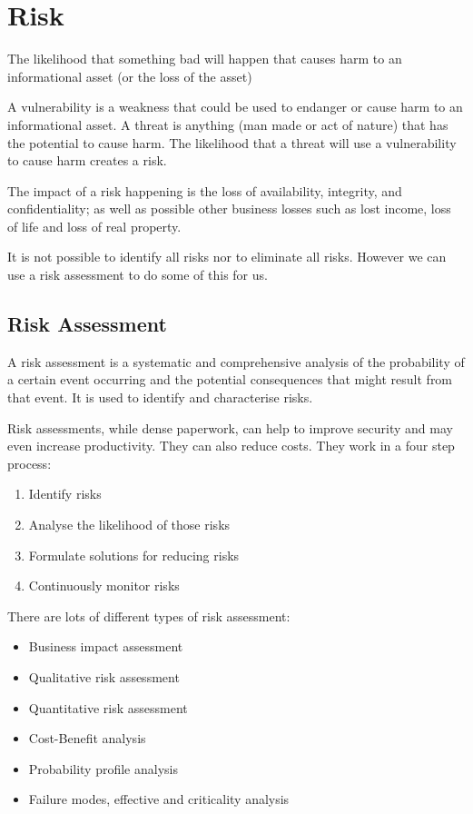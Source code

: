 \section{Risk}
\begin{define}
    \item[Risk] The likelihood that something bad will happen that causes harm to an informational asset (or the loss of the asset)
\end{define}

A vulnerability is a weakness that could be used to endanger or cause harm to an informational asset. A threat is anything (man made or act of nature) that has the potential to cause harm. The likelihood that a threat will use a vulnerability to cause harm creates a risk. 

The impact of a risk happening is the loss of availability, integrity, and confidentiality; as well as possible other business losses such as lost income, loss of life and loss of real property. 

It is not possible to identify all risks nor to eliminate all risks. However we can use a risk assessment to do some of this for us. 

\subsection{Risk Assessment}
A risk assessment is a systematic and comprehensive analysis of the probability of a certain event occurring and the potential consequences that might result from that event. It is used to identify and characterise risks. 

Risk assessments, while dense paperwork, can help to improve security and may even increase productivity. They can also reduce costs. They work in a four step process:
\begin{enumerate}
    \item Identify risks
    \item Analyse the likelihood of those risks
    \item Formulate solutions for reducing risks
    \item Continuously monitor risks
\end{enumerate}

There are lots of different types of risk assessment:
\begin{itemize}
    \item Business impact assessment
    \item Qualitative risk assessment
    \item Quantitative risk assessment
    \item Cost-Benefit analysis
    \item Probability profile analysis
    \item Failure modes, effective and criticality analysis
\end{itemize}


